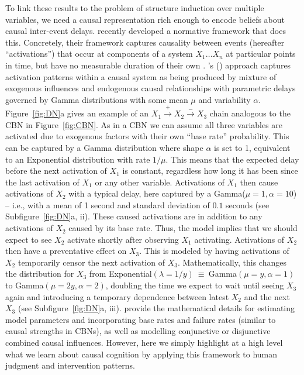 \documentclass{cambridge7A}%
\def\citeapos#1{\citeauthor{#1}'s (\citeyear{#1})}
\begin{document}
To link these results to the problem of structure induction over multiple variables, we need a causal representation rich enough to encode beliefs about causal inter-event delays.  %
\cite{bramley2018time} recently developed a normative framework that does this.  %
Concretely, their framework captures causality between events (hereafter ``activations'') that occur at components of a system $X_1\ldots X_n$ at particular points in time, but have no measurable duration of their own \citep{cox1980point}.  \citeapos{bramley2018time} approach captures activation patterns within a causal system as being produced by mixture of exogenous influences and endogenous causal relationships with parametric delays governed by Gamma distributions with some mean $\mu$ and variability $\alpha$. Figure~\ref{fig:DN}a gives an example of an  $X_1\!\stackrel{+}\rightarrow\!X_2\!\stackrel{-}\rightarrow\!X_3$ chain analogous to the CBN in Figure~\ref{fig:CBN}.  %
As in a CBN we can assume all three variables are activated due to exogenous factors with their own ``base rate'' probability.  This can be captured by a Gamma distribution where shape $\alpha$ is set to 1, equivalent to an Exponential distribution with rate $1/\mu$.  This means that the expected delay before the next activation of $X_1$ is constant, regardless how long it has been since the last activation of $X_1$ or any other variable.  Activations of $X_1$ then cause activations of $X_2$ with a typical delay, here captured by a Gamma($\mu=1,\alpha=10$) -- i.e., with a mean of 1 second and standard deviation of $0.1$ seconds (see Subfigure~\ref{fig:DN}a, ii).  These caused activations are in addition to any activations of $X_2$ caused by its base rate.  Thus, the model implies that we should expect to see $X_2$ activate shortly after observing $X_1$ activating.  Activations of $X_2$ then have a preventative effect on $X_3$.  This is modeled by having activations of $X_2$ temporarily censor the next activation of $X_3$.  Mathematically, this changes the distribution for $X_3$ from Exponential$(\lambda = 1/y)~\equiv~$Gamma$(\mu = y, \alpha = 1)$ to Gamma$(\mu = 2y, \alpha = 2)$, doubling the time we expect to wait until seeing $X_3$ again and introducing a temporary dependence between latest $X_2$ and the next $X_3$ (see Subfigure~\ref{fig:DN}a, iii).  %
\cite{bramley2018time} provide the mathematical details for estimating model parameters and incorporating base rates and failure rates (similar to causal strengths in CBNs), as well as modelling conjunctive or disjunctive combined causal influences. However, here we simply highlight at a high level what we learn about causal cognition by applying this framework to human judgment and intervention patterns.  %
\end{document}
